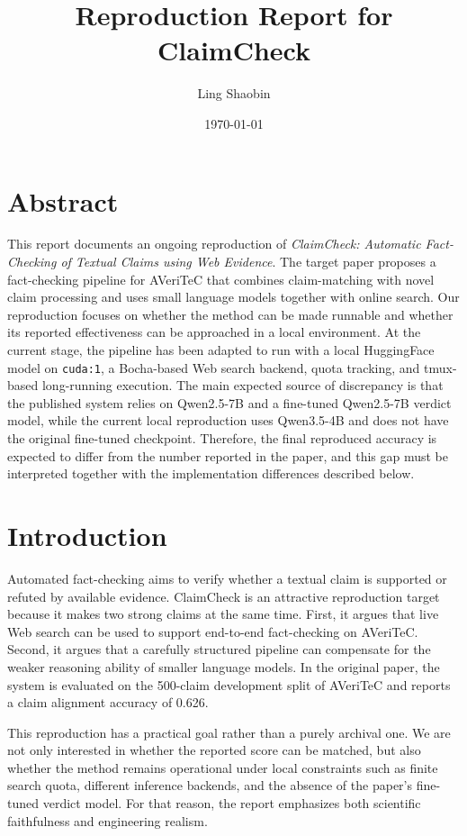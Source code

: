 \documentclass[11pt]{article}
\title{Reproduction Report for ClaimCheck}
\author{Ling Shaobin}
\date{\today}
\begin{document}
\maketitle

\section*{Abstract}
This report documents an ongoing reproduction of \textit{ClaimCheck: Automatic Fact-Checking of Textual Claims using Web Evidence}. The target paper proposes a fact-checking pipeline for AVeriTeC that combines claim-matching with novel claim processing and uses small language models together with online search. Our reproduction focuses on whether the method can be made runnable and whether its reported effectiveness can be approached in a local environment. At the current stage, the pipeline has been adapted to run with a local HuggingFace model on \texttt{cuda:1}, a Bocha-based Web search backend, quota tracking, and tmux-based long-running execution. The main expected source of discrepancy is that the published system relies on Qwen2.5-7B and a fine-tuned Qwen2.5-7B verdict model, while the current local reproduction uses Qwen3.5-4B and does not have the original fine-tuned checkpoint. Therefore, the final reproduced accuracy is expected to differ from the number reported in the paper, and this gap must be interpreted together with the implementation differences described below.

\section*{Introduction}
Automated fact-checking aims to verify whether a textual claim is supported or refuted by available evidence. ClaimCheck is an attractive reproduction target because it makes two strong claims at the same time. First, it argues that live Web search can be used to support end-to-end fact-checking on AVeriTeC. Second, it argues that a carefully structured pipeline can compensate for the weaker reasoning ability of smaller language models. In the original paper, the system is evaluated on the 500-claim development split of AVeriTeC and reports a claim alignment accuracy of 0.626.

This reproduction has a practical goal rather than a purely archival one. We are not only interested in whether the reported score can be matched, but also whether the method remains operational under local constraints such as finite search quota, different inference backends, and the absence of the paper's fine-tuned verdict model. For that reason, the report emphasizes both scientific faithfulness and engineering realism.
\end{document}
